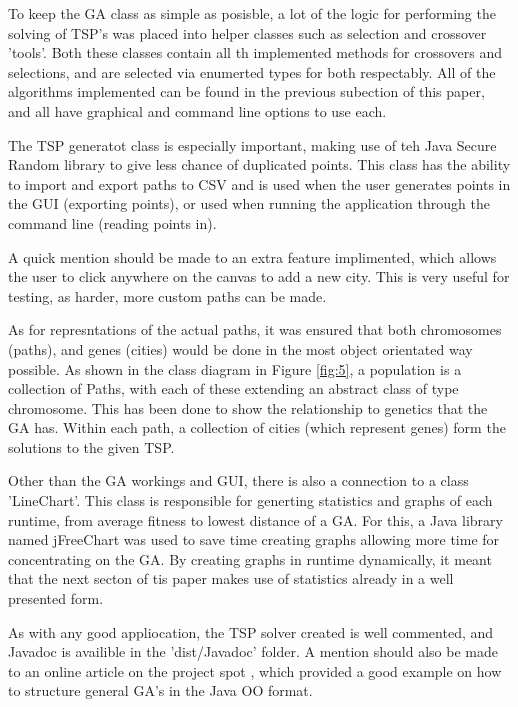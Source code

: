 \documentclass[article]{IEEEtran}
\begin{document}
To keep the GA class as simple as posisble, a lot of the logic for performing the solving of TSP's was placed into helper classes such as selection and crossover 'tools'. Both these classes contain all th implemented methods for crossovers and selections, and are selected via enumerted types for both respectably. All of the algorithms implemented can be found in the previous subection of this paper, and all have graphical and command line options to use each. \par
The TSP generatot class is especially important, making use of teh Java Secure Random library to give less chance of duplicated points. This class has the ability to import and export paths to CSV and is used when the user generates points in the GUI (exporting points), or used when running the application through the command line (reading points in).\par
A quick mention should be made to an extra feature implimented, which allows the user to click anywhere on the canvas to add a new city. This is very useful for testing, as harder, more custom paths can be made. \par
As for represntations of the actual paths, it was ensured that both chromosomes (paths), and genes (cities) would be done in the most object orientated way possible. As shown in the class diagram in Figure \ref{fig:5}, a population is a collection of Paths, with each of these extending an abstract class of type chromosome. This has been done to show the relationship to genetics that the GA has. Within each path, a collection of cities (which represent genes) form the solutions to the given TSP. \par
Other than the GA workings and GUI, there is also a connection to a class 'LineChart'. This class is responsible for generting statistics and graphs of each runtime, from average fitness to lowest distance of a GA. For this, a Java library named jFreeChart \cite{10} was used to save time creating graphs allowing more time for concentrating on the GA. By creating graphs in runtime dynamically, it meant that the next secton of tis paper makes use of statistics already in a well presented form.\par
As with any good appliocation, the TSP solver created is well commented, and Javadoc is availible in the 'dist/Javadoc' folder. A mention should also be made to an online article on the project spot \cite{11}, which provided a good example on how to structure general GA's in the Java OO format.
\end{document}
